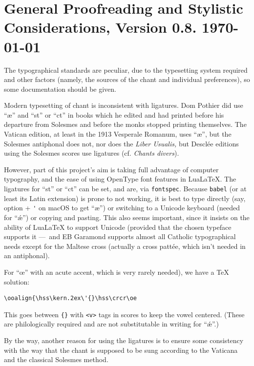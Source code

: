 \documentclass[11pt]{article}
\begin{document}
\section{General Proofreading and Stylistic Considerations, Version 0.8. \today}

The typographical standards are peculiar, due to the typesetting system required and other factors (namely, the sources of the chant and individual preferences), so some documentation should be given.

Modern typesetting of chant is inconsistent with ligatures. Dom Pothier did use ``æ'' and ``st'' or ``ct'' in books which he edited and had printed before his departure from Solesmes and before the monks stopped printing themselves. The Vatican edition, at least in the 1913 Vesperale Romanum, uses ``æ'', but the Solesmes antiphonal does not, nor does the \textit{Liber Usualis,} but Desclée editions using the Solesmes scores use ligatures (cf. \textit{Chants divers}).

However, part of this project's aim is taking full advantage of computer typography, and the ease of using OpenType font features in Lua\LaTeX{}. The ligatures for ``st'' or ``ct'' can be set, and are, via \verb|fontspec|. Because \verb|babel| (or at least its Latin extension) is prone to not working, it is best to type directly (say, option + \verb|'| on macOS to get ``æ'') or switching to a Unicode keyboard (needed for ``ǽ'') or copying and pasting. This also seems important, since it insists on the ability of Lua\LaTeX{} to support Unicode (provided that the chosen typeface supports it — and EB Garamond supports almost all Catholic typographical needs except for the Maltese cross (actually a cross pattée, which isn't needed in an antiphonal).

For ``œ'' with an acute accent, which is very rarely needed), we have a \TeX{} solution:

\begin{verbatim}\ooalign{\hss\kern.2ex\'{}\hss\crcr\oe\end{verbatim}

This goes between \verb|{}| with \verb|<v>| tags in scores to keep the vowel centered. (These are philologically required and are not substitutable in writing for ``ǽ''.)

By the way, another reason for using the ligatures is to ensure some consistency with the way that the chant is supposed to be sung according to the Vaticana and the classical Solesmes method.
\end{document}
